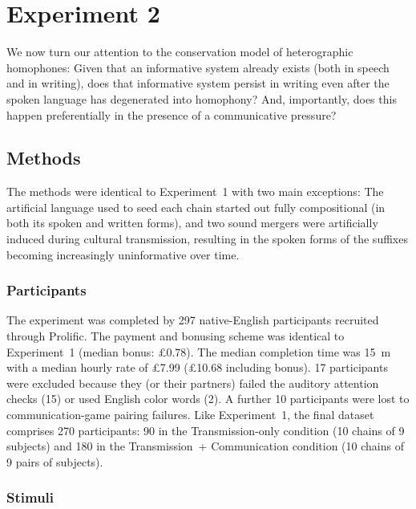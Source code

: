 \documentclass[doc,biblatex]{apa7}
\begin{document}
\section{Experiment 2}

We now turn our attention to the conservation model of heterographic homophones: Given that an informative system already exists (both in speech and in writing), does that informative system persist in writing even after the spoken language has degenerated into homophony? And, importantly, does this happen preferentially in the presence of a communicative pressure?

\subsection{Methods}

The methods were identical to Experiment~1 with two main exceptions: The artificial language used to seed each chain started out fully compositional (in both its spoken and written forms), and two sound mergers were artificially induced during cultural transmission, resulting in the spoken forms of the suffixes becoming increasingly uninformative over time.

\subsubsection{Participants}

The experiment was completed by 297 native-English participants recruited through Prolific. The payment and bonusing scheme was identical to Experiment~1 (median bonus: £0.78). The median completion time was 15~m with a median hourly rate of £7.99 (£10.68 including bonus). 17 participants were excluded because they (or their partners) failed the auditory attention checks (15) or used English color words (2). A further 10 participants were lost to communication-game pairing failures. Like Experiment~1, the final dataset comprises 270 participants: 90 in the Transmission-only condition (10 chains of 9 subjects) and 180 in the Transmission~+ Communication condition (10 chains of 9 pairs of subjects).

\subsubsection{Stimuli}
\end{document}

